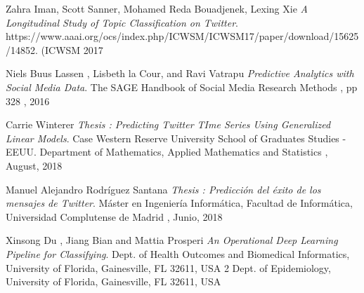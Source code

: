 \begin{thebibliography}{9}
Zahra Iman, Scott Sanner, Mohamed Reda Bouadjenek, Lexing Xie
\textit{A Longitudinal Study of Topic Classification on Twitter}. 
https://www.aaai.org/ocs/index.php/ICWSM/ICWSM17/paper/download/15625/14852.
(ICWSM 2017

Niels Buus Lassen , Lisbeth la Cour, and Ravi Vatrapu
\textit{Predictive Analytics with Social Media Data}. 
The SAGE Handbook of Social Media Research Methods ,  pp 328 , 2016


Carrie Winterer
\textit{Thesis : Predicting Twitter TIme Series Using Generalized Linear Models}. 
Case Western Reserve University School of Graduates Studies - EEUU.
Department of Mathematics, Applied Mathematics and Statistics ,  August, 2018


Manuel Alejandro Rodr\'iguez Santana
\textit{Thesis : Predicción del éxito de los mensajes de Twitter}. 
Máster en Ingenier\'ia Inform\'atica, Facultad de Inform\'atica, Universidad Complutense de
Madrid ,  Junio, 2018

Xinsong Du , Jiang Bian and Mattia Prosperi
\textit{An Operational Deep Learning Pipeline for Classifying}. 
Dept. of Health Outcomes and Biomedical Informatics,
University of Florida, Gainesville, FL 32611, USA 2 Dept. of Epidemiology, University of Florida, Gainesville, FL 32611, USA








\end{thebibliography}